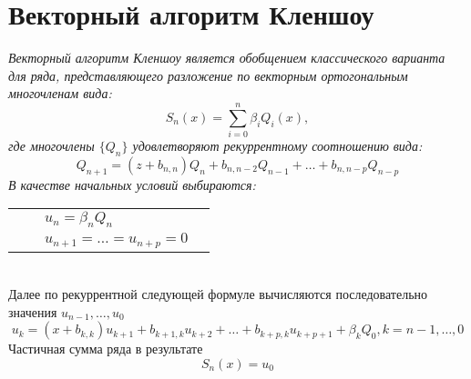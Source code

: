 \section{Векторный алгоритм Кленшоу}
\it Векторный алгоритм Кленшоу \rm является обобщением
классического варианта для ряда, представляющего разложение по
векторным ортогональным многочленам вида:
$$%
S_n(x)=\sum\limits_{i=0}^{n}\beta_iQ_i(x),
$$%
где многочлены $\{Q_n\}$ удовлетворяют рекуррентному соотношению
вида:
$$%
Q_{n+1}=(z+b_{n,n})Q_n+b_{n,n-2}Q_{n-1}+\ldots+b_{n,n-p}Q_{n-p}
$$%
В качестве начальных условий выбираются: \\
\begin{tabular} {llll}
&    &    $u_n=\beta_nQ_n$ \\
&    &    $u_{n+1}=\ldots=u_{n+p}=0$ \\
\end{tabular} \\
Далее по рекуррентной следующей формуле  вычисляются последовательно значения $u_{n-1},\ldots,u_0$\\
$$
u_k=(x+b_{k,k})u_{k+1}+b_{k+1,k}u_{k+2}+\ldots+b_{k+p,k}u_{k+p+1}+\beta_kQ_0,
k=n-1,\ldots,0
$$
Частичная сумма ряда в результате $$S_n(x)=u_0$$

